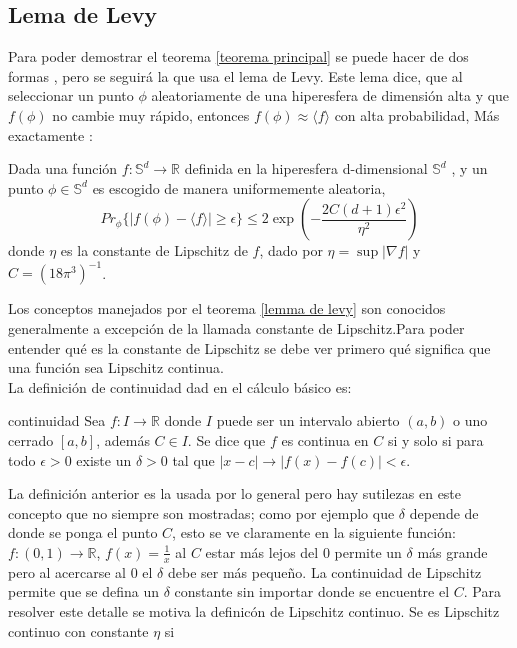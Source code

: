 \subsection{Lema de Levy} \label{ levy}
Para poder demostrar el teorema \ref{teorema principal} se puede hacer de dos formas \cite{Popescu2006}, pero se seguirá la que usa el lema de Levy. Este lema dice, que al seleccionar un punto $\phi$ aleatoriamente de una hiperesfera de dimensión alta y que $f(\phi)$ no cambie muy rápido, entonces $f(\phi) \approx \langle f \rangle $ con alta probabilidad, Más exactamente  \cite{Lema}:
\\
\begin{lemma} \label{lemma de levy}

Dada una función $f: \mathbb{S}^d \to \mathbb{R} $ definida en la hiperesfera d-dimensional $\mathbb{S}^d$ , y un punto $\phi \in \mathbb{S}^d $ es escogido de manera uniformemente aleatoria,
\begin{equation}
Pr_{\phi} \{ |f(\phi)- \langle f \rangle| \geq \epsilon \} \leq 2 \exp(-\frac{2C(d+1)\epsilon^2}{\eta^2})
\end{equation}
donde $\eta$ es la constante de Lipschitz de $f$, dado por $\eta= \sup|\nabla f|$ y $C=(18 \pi^3)^{-1} $.\\

\end{lemma}

Los conceptos manejados por el teorema \ref{lemma de levy} son conocidos generalmente a excepción de la llamada constante de Lipschitz.Para poder entender qué es la  constante de Lipschitz se debe ver primero qué significa que una función sea Lipschitz continua. 
\\
La definición de continuidad dad en el cálculo básico es:

\theoremstyle{definition}
\begin{definition}{continuidad}
Sea $f: I \to \mathbb{R}$ donde $I$ puede ser un intervalo abierto $(a,b)$ o uno cerrado $[a,b]$, además $C \in I$. Se dice que $f$ es continua en $C$ si y solo si para todo $ \epsilon >0 $  existe un $ \delta >0 $ tal que  $ |x-c|\longrightarrow |f(x)-f(c)|< \epsilon $.
\end{definition} 

La  definición anterior es la usada por lo general pero hay sutilezas en este concepto que no siempre son mostradas; como por ejemplo que $\delta$ depende de donde se ponga el  punto $C$, esto se ve claramente en la siguiente función: $f: (0,1) \to \mathbb{R}$, $f(x)=\frac{1}{x} $ al $C$ estar más lejos del $0$ permite un $\delta$ más grande pero al acercarse al $0$ el $\delta$ debe ser más pequeño. La continuidad de Lipschitz permite que se defina un $\delta$ constante sin importar donde se encuentre el $C$. Para resolver este detalle se motiva la definicón de Lipschitz continuo. Se es Lipschitz continuo con constante $\eta$ si

